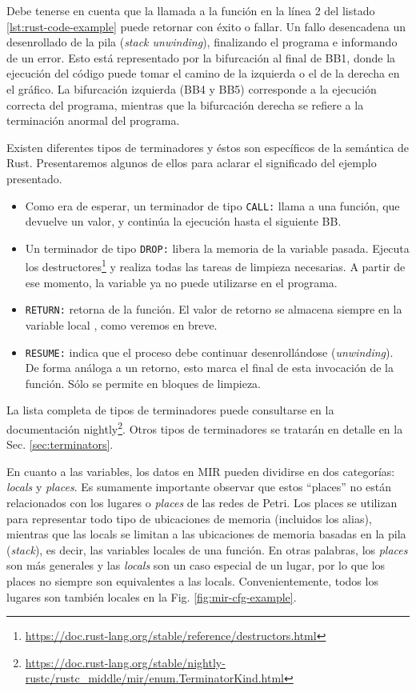 Debe tenerse en cuenta que la llamada a la función 
en la línea 2 del listado \ref{lst:rust-code-example} puede retornar con éxito o fallar.
Un fallo desencadena un desenrollado de la pila (\emph{stack unwinding}),
finalizando el programa e informando de un error.
Esto está representado por la bifurcación al final de BB1, donde la
ejecución del código puede tomar el camino de la izquierda o el de la derecha en el gráfico. La
bifurcación izquierda (BB4 y BB5) corresponde a la ejecución correcta del programa, mientras
que la bifurcación derecha se refiere a la terminación anormal del programa.

Existen diferentes tipos de terminadores y éstos son específicos de la semántica de Rust.
Presentaremos algunos de ellos para aclarar el significado del ejemplo presentado.

\begin{itemize}
    \item Como era de esperar, un terminador de tipo \texttt{CALL:} llama a una función, que devuelve un
          valor, y continúa la ejecución hasta el siguiente \acrshort{BB}.
    \item Un terminador de tipo \texttt{DROP:} libera la memoria de la variable pasada. Ejecuta los
          destructores\footnote{\url{https://doc.rust-lang.org/stable/reference/destructors.html}}
          y realiza todas las tareas de limpieza necesarias. A partir de ese momento, la
          variable ya no puede utilizarse en el programa.
    \item \texttt{RETURN:} retorna de la función. El valor de retorno se almacena siempre en la variable local
          , como veremos en breve.
    \item \texttt{RESUME:} indica que el proceso debe continuar desenrollándose (\textit{unwinding}).
          De forma análoga a un retorno, esto marca el final de esta invocación de la función. Sólo se permite en bloques de
          limpieza.
\end{itemize}

La lista completa de tipos de terminadores puede consultarse en la documentación
nightly\footnote{\url{https://doc.rust-lang.org/stable/nightly-rustc/rustc_middle/mir/enum.TerminatorKind.html}}.
Otros tipos de terminadores se tratarán en detalle en la Sec. \ref{sec:terminators}.

En cuanto a las variables, los datos en \acrshort{MIR} pueden dividirse en dos categorías: \emph{locals} y
\emph{places}. Es sumamente importante observar que estos ``places'' no están relacionados con los lugares o \emph{places} de
las redes de Petri.
Los places se utilizan para representar todo tipo de ubicaciones de memoria
(incluidos los alias), mientras que las locals se limitan a las ubicaciones de memoria basadas
en la pila (\emph{stack}), es decir, las variables locales de una función.
En otras palabras, los \emph{places} son más
generales y las \emph{locals} son un caso especial de un lugar,
por lo que los places no siempre son equivalentes a las locals.
Convenientemente, todos los lugares son también locales en la Fig. \ref{fig:mir-cfg-example}.

